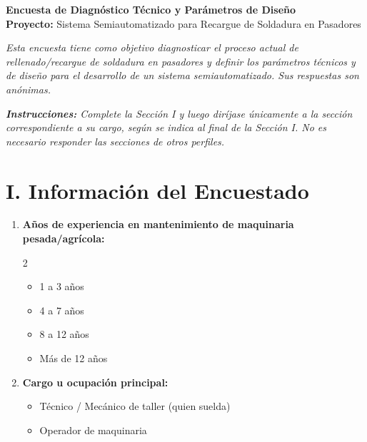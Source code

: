 \documentclass[11pt,a4paper]{article}
\begin{document}
\begin{center}
    \Large\textbf{Encuesta de Diagnóstico Técnico y Parámetros de Diseño}\\
    \vspace{0.2cm}
    \normalsize\textbf{Proyecto:} Sistema Semiautomatizado para Recargue de Soldadura en Pasadores
\end{center}

\vspace{0.3cm}
\noindent\textit{Esta encuesta tiene como objetivo diagnosticar el proceso actual de rellenado/recargue de soldadura en pasadores y definir los parámetros técnicos y de diseño para el desarrollo de un sistema semiautomatizado. Sus respuestas son anónimas.}

\vspace{0.2cm}
\noindent\textit{\textbf{Instrucciones:} Complete la Sección I y luego diríjase \'unicamente a la sección correspondiente a su cargo, según se indica al final de la Sección I. No es necesario responder las secciones de otros perfiles.}
\vspace{0.4cm}

\section*{I. Información del Encuestado}
\begin{enumerate}[series=encuesta, label=\textbf{\arabic*.}, leftmargin=*]
    \item \textbf{Años de experiencia en mantenimiento de maquinaria pesada/agrícola:}
    \begin{multicols}{2}
    \begin{itemize}[label=$\square$, leftmargin=*]
        \item 1 a 3 años
        \item 4 a 7 años
        \item 8 a 12 años
        \item Más de 12 años
    \end{itemize}
    \end{multicols}

    \item \textbf{Cargo u ocupación principal:}
    \begin{itemize}[label=$\square$, leftmargin=*]
        \item Técnico / Mecánico de taller (quien suelda)
        \item Operador de maquinaria
    \end{itemize}
\end{enumerate}
\end{document}
